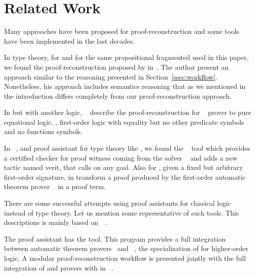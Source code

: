 \documentclass[../main.tex]{subfiles}
\begin{document}

\section{Related Work}
\label{sec:related-work}

Many approaches have been proposed for proof-reconstruction and some tools have been implemented in the last decades.

In type theory, for \Agda and  for the same propositional fragmented used in this paper,
we found the proof-reconstruction proposed by \citeauthor{Kanso2012}
in~\cite{Kanso2012,kanso2016light}. The author present an approach similar to
the reasoning presented in Section~\ref{ssec:workflow}.
Nonetheless, his approach includes semantics reasoning that as we mentioned
in the introduction differs completely from our proof-reconstruction approach.

In \Agda but with another logic, \citeauthor{foster2011integrating}~\cite{foster2011integrating}
describe the proof-reconstruction for ~\cite{hillenbrand1997}
prover to pure equational logic, \ie,
first-order logic with equality but no other predicate symbols and no
functions symbols.

In ~\cite{coqteam}, and proof assistant for type theory like \Agda,
we found the ~\cite{armand2011,Ekici2017} tool which provides a
certified checker for proof witness coming from the \SMT solver
~\cite{bouton2009} and adds a new tactic named verit,
that calls  on any  goal.
Also for ,
given a fixed but arbitrary first-order signature,
\citeauthor{Bezem2002} in \cite{Bezem2002}
transform a proof produced by the first-order automatic theorem
prover ~\cite{deNivelle2003} in a  proof
term.

There are some successful attempts using proof assistants for classical logic
instead of type theory.
Let us mention some representative of such tools. This descriptions is
mainly based on~\citeauthor{Sicard-Ramirez2016}~\cite{Sicard-Ramirez2016}.

The  proof assistant has the  tool.
This program provides a full integration between
automatic theorem provers~\cite{blanchette2013extending,Fleury2014,bohme2010} and
~\cite{nipkow2002isabelle}, the specialization of
 for higher-order logic.
A modular proof-reconstruction workflow is presented jointly with
the full integration of  and  provers with
 in \citeauthor{Een2004}~\cite{Een2004}.
\end{document}

